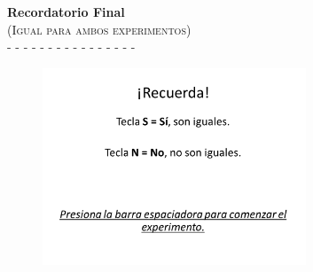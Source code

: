 \documentclass[a4paper ]{article}
\begin{document}
\begin{center}
{\LARGE \textbf{Recordatorio Final}}\\
{\large \textsc{(Igual para ambos experimentos)}}\\
-  -  -  -  -  -  -  -  -  -  -  -  -  -  -  -
\smallskip
\end{center}
\vspace{3mm}
\begin{figure}[th]
\centering
\includegraphics[width=0.7\textwidth]{Figures/Inst_4} 
\end{figure}
\clearpage
\end{document}
